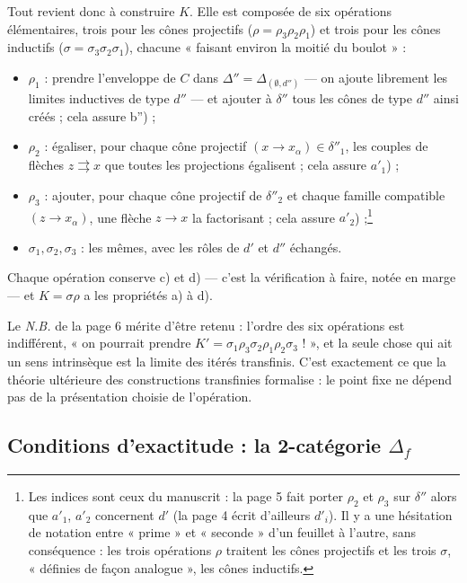 \documentclass[11pt,a4paper]{article}
\begin{document}
Tout revient donc à construire $K$. Elle est composée de six opérations
élémentaires, trois pour les cônes projectifs ($\rho = \rho_{3}\rho_{2}
\rho_{1}$) et trois pour les cônes inductifs ($\sigma = \sigma_{3}\sigma_{2}
\sigma_{1}$), chacune « faisant environ la moitié du boulot » :
\begin{itemize}
\item $\rho_{1}$ : prendre l'enveloppe de $C$ dans $\Delta'' =
\Delta_{(\emptyset, d'')}$ — on ajoute librement les limites inductives de
type $d''$ — et ajouter à $\delta''$ tous les cônes de type $d''$ ainsi
créés ; cela assure b'') ;
\item $\rho_{2}$ : égaliser, pour chaque cône projectif $(x \to
x_{\alpha}) \in \delta''_{1}$, les couples de flèches $z \rightrightarrows
x$ que toutes les projections égalisent ; cela assure $a'_{1}$) ;
\item $\rho_{3}$ : ajouter, pour chaque cône projectif de $\delta''_{2}$ et
chaque famille compatible $(z \to x_{\alpha})$, une flèche $z \to x$ la
factorisant ; cela assure $a'_{2}$) ;\footnote{Les indices sont ceux du
manuscrit : la page 5 fait porter $\rho_{2}$ et $\rho_{3}$ sur $\delta''$
alors que $a'_{1}$, $a'_{2}$ concernent $d'$ (la page 4 écrit d'ailleurs
$d'_{i}$). Il y a une hésitation de notation entre « prime » et « seconde »
d'un feuillet à l'autre, sans conséquence : les trois opérations $\rho$
traitent les cônes projectifs et les trois $\sigma$, « définies de façon
analogue », les cônes inductifs.}
\item $\sigma_{1}, \sigma_{2}, \sigma_{3}$ : les mêmes, avec les rôles de
$d'$ et $d''$ échangés.
\end{itemize}
Chaque opération conserve c) et d) — c'est la vérification à faire, notée
en marge — et $K = \sigma\rho$ a les propriétés a) à d).

Le \emph{N.B.} de la page 6 mérite d'être retenu : l'ordre des six
opérations est indifférent, « on pourrait prendre $K' = \sigma_{1}\rho_{3}
\sigma_{2}\rho_{1}\rho_{2}\sigma_{3}$ ! », et la seule chose qui ait un sens
intrinsèque est la limite des itérés transfinis. C'est exactement ce que la
théorie ultérieure des constructions transfinies formalise : le point fixe
ne dépend pas de la présentation choisie de l'opération.

\subsection*{Conditions d'exactitude : la 2-catégorie $\Delta_{f}$}
\end{document}
